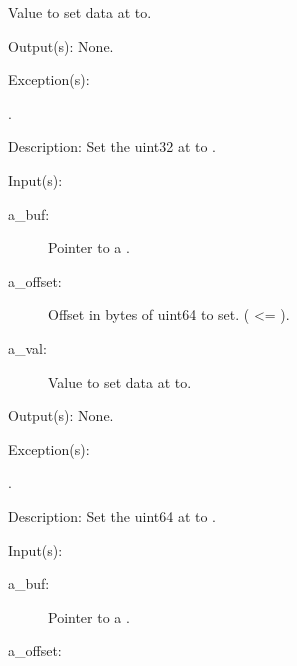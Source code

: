\begin{capi}
\begin{capilist}
\begin{description}
			Value to set data at  to.
		\end{description}
	\item[Output(s): ] None.
	\item[Exception(s): ]
		\begin{description}\item[]
		\item[.]
		\end{description}
	\item[Description: ]
		Set the uint32 at  to .
	\end{capilist}
\label{buf_uint64_set}
	\begin{capilist}
	\item[Input(s): ]
		\begin{description}\item[]
		\item[a\_buf: ]
			Pointer to a .
		\item[a\_offset: ]
			Offset in bytes of uint64 to set.  ( <=
			).
		\item[a\_val: ]
			Value to set data at  to.
		\end{description}
	\item[Output(s): ] None.
	\item[Exception(s): ]
		\begin{description}\item[]
		\item[.]
		\end{description}
	\item[Description: ]
		Set the uint64 at  to .
	\end{capilist}
\label{buf_range_set}
	\begin{capilist}
	\item[Input(s): ]
		\begin{description}\item[]
		\item[a\_buf: ]
			Pointer to a \classname{buf}.
		\item[a\_offset: ]

\end{description}
\end{capilist}
\end{capi}

